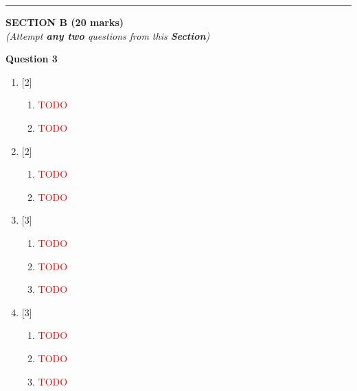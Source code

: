 \par\noindent\rule{\textwidth}{0.4pt}
\begin{center}
   \large
   \textbf{SECTION B (20 marks)}\\
   \vspace{5mm}
   \normalsize
   \textit{(Attempt \textbf{any two} questions from this \textbf{Section})}
\end{center}
\par

\noindent
\textbf{Question 3}
\begin{enumerate}[label=(\roman*)]

    \item \hfill [2]
        \begin{enumerate}[label=(\alph*)]
            \item \textcolor{red}{TODO}
            \item \textcolor{red}{TODO}
        \end{enumerate}

    \item \hfill [2]
        \begin{enumerate}[label=(\alph*)]
            \item \textcolor{red}{TODO}
            \item \textcolor{red}{TODO}
        \end{enumerate}

    \item \hfill [3]
        \begin{enumerate}[label=(\alph*)]
            \item \textcolor{red}{TODO}
            \item \textcolor{red}{TODO}
            \item \textcolor{red}{TODO}
        \end{enumerate}

    \item \hfill [3]
        \begin{enumerate}[label=(\alph*)]
            \item \textcolor{red}{TODO}
            \item \textcolor{red}{TODO}
            \item \textcolor{red}{TODO}
        \end{enumerate}

\end{enumerate}

